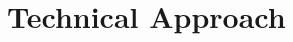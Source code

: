 \documentclass[10pt,twocolumn,letterpaper]{article}
\begin{document}
	
\section{Technical Approach}
\end{document}
